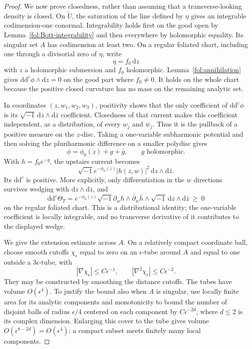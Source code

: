 \documentclass[11pt,letterpaper]{article}
\newcommand{\dd}{\mathrm{d}}
\newcommand{\ii}{\sqrt{-1}}
\newcommand{\ddc}{\mathrm{d}\mathrm{d}^{c}}
\theoremstyle{definition}
\theoremstyle{remark}
\begin{document}
\begin{proof}
We now prove closedness, rather than assuming that a transverse-looking
density is closed.  On $\widetilde U$, the saturation of the line defined
by $\eta$ gives an integrable codimension-one conormal.  Integrability
holds first on the good open by Lemma~\ref{fol:Bott-integrability} and
then everywhere by holomorphic equality.  Its singular set $A$ has
codimension at least two.  On a regular foliated chart, including one
through a divisorial zero of $\eta$, write
\begin{equation}\label{fol:local-foliation}
 \eta=f_0\,\dd z
\end{equation}
with $z$ a holomorphic submersion and $f_0$ holomorphic.
Lemma~\ref{fol:annihilation} gives
$\ddc\phi\wedge\dd z=0$ on the good part where $f_0\ne0$.
It holds on the whole chart because the positive closed curvature
has no mass on the remaining analytic set.

In coordinates $(z,w_1,w_2,w_3)$, positivity shows that the only
coefficient of $\ddc\phi$ is its
$\ii\,\dd z\wedge\dd\bar z$ coefficient.  Closedness of that current
makes this coefficient independent, as a distribution, of every $w_j$
and $\bar w_j$.  Thus it is the pullback of a positive measure on the
$z$-disc.  Taking a one-variable subharmonic potential and then solving
the pluriharmonic difference on a smaller polydisc gives
\begin{equation}\label{fol:split-weight}
 \phi=\phi_0(z)+g+\bar g,\qquad g\text{ holomorphic}.
\end{equation}
With $h=f_0e^{-g}$, the upstairs current becomes
\[
 \ii e^{-\phi_0(z)}|h(z,w)|^2\,\dd z\wedge\dd\bar z.
\]
Its $\ddc$ is positive.  More explicitly, only differentiation in the
$w$ directions survives wedging with
$\dd z\wedge\dd\bar z$, and
\begin{equation}\label{fol:leaf-Hessian}
 \ddc\Theta_T
 =
 e^{-\phi_0(z)}
 \ii\partial_w h\wedge\bar\partial_w\bar h
 \wedge\ii\,\dd z\wedge\dd\bar z
 \ \geq\ 0
\end{equation}
on the regular foliated chart.  This is a distributional identity;
the one-variable coefficient is locally integrable, and no transverse
derivative of it contributes to the displayed wedge.

We give the extension estimate across $A$.  On a relatively compact
coordinate ball, choose smooth cutoffs $\chi_\epsilon$ equal to zero
on an $\epsilon$-tube around $A$ and equal to one outside a
$3\epsilon$-tube, with
\[
 |\nabla\chi_\epsilon|\leq C\epsilon^{-1},
 \qquad
 |\nabla^2\chi_\epsilon|\leq C\epsilon^{-2}.
\]
They may be constructed by smoothing the distance cutoffs.  The tubes
have volume $O(\epsilon^4)$.  To justify the bound also when $A$ is
singular, use locally finite area for its analytic components and
monotonicity to bound the number of disjoint balls of radius
$\epsilon/4$ centered on each component by
$C\epsilon^{-2d}$, where $d\leq2$ is its complex dimension.
Enlarging this cover to the tube gives volume
$O(\epsilon^{8-2d})=O(\epsilon^4)$; a compact subset meets finitely
many local components.


\end{proof}
\end{document}
